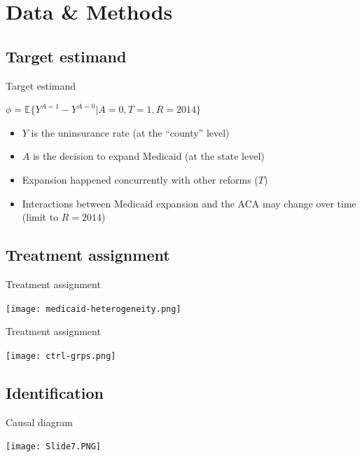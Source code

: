 \documentclass[hyperref={pdfpagelabels=false}]{beamer}
\begin{document}
\section{Data \& Methods}

\subsection{Target estimand}

\begin{frame}{Target estimand}
\begin{center}$\phi = \mathbb{E}\{Y^{A = 1} - Y^{A = 0} | A = 0, T = 1, R = 2014\}$\end{center} \bigskip 
    \begin{itemize}
        \item $Y$ is the uninsurance rate (at the ``county'' level) \bigskip 
        \item $A$ is the decision to expand Medicaid (at the state level) \bigskip 
        \item Expansion happened concurrently with other reforms ($T$) \bigskip 
        \item Interactions between Medicaid expansion and the ACA may change over time (limit to $R = 2014$)  
    \end{itemize}
\end{frame}

\subsection{Treatment assignment}

\begin{frame}{Treatment assignment}
    \begin{center}
	\texttt{[image: medicaid-heterogeneity.png]}
    \end{center}
\end{frame}

\begin{frame}{Treatment assignment}
    \begin{center}
	\texttt{[image: ctrl-grps.png]}  
    \end{center}
\end{frame}

\subsection{Identification}

\begin{frame}{Causal diagram}
    \begin{center}
	\texttt{[image: Slide7.PNG]}
    \end{center}
\end{frame}
\end{document}

